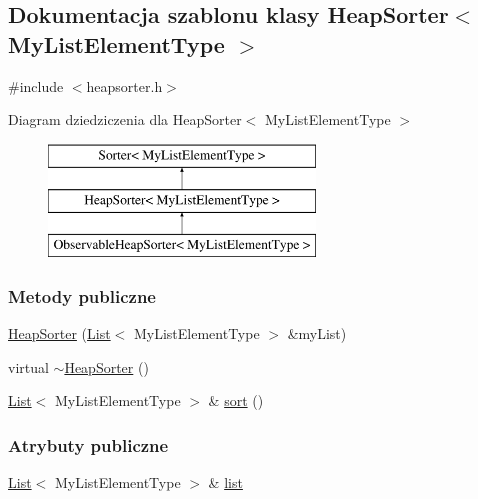 \hypertarget{class_heap_sorter}{\subsection{Dokumentacja szablonu klasy Heap\-Sorter$<$ My\-List\-Element\-Type $>$}
\label{class_heap_sorter}
}


{\ttfamily \#include $<$heapsorter.\-h$>$}

Diagram dziedziczenia dla Heap\-Sorter$<$ My\-List\-Element\-Type $>$\begin{figure}[H]
\begin{center}
\leavevmode
\includegraphics[height=3.000000cm]{class_heap_sorter}
\end{center}
\end{figure}
\subsubsection*{Metody publiczne}
\begin{DoxyCompactItemize}
\item 
\hyperlink{class_heap_sorter_a7d5fba788aae93bcfc1a300615dba080}{Heap\-Sorter} (\hyperlink{class_list}{List}$<$ My\-List\-Element\-Type $>$ \&my\-List)
\item 
virtual \hyperlink{class_heap_sorter_ab661e8598cf879b9c8f721c644633e66}{$\sim$\-Heap\-Sorter} ()
\item 
\hyperlink{class_list}{List}$<$ My\-List\-Element\-Type $>$ \& \hyperlink{class_heap_sorter_a31220ba55d4478c50578c3a94dcbf26c}{sort} ()
\end{DoxyCompactItemize}
\subsubsection*{Atrybuty publiczne}
\begin{DoxyCompactItemize}
\item 
\hyperlink{class_list}{List}$<$ My\-List\-Element\-Type $>$ \& \hyperlink{class_heap_sorter_a6b8ac615ff2de0c2e510ad215d0508d9}{list}
\end{DoxyCompactItemize}


